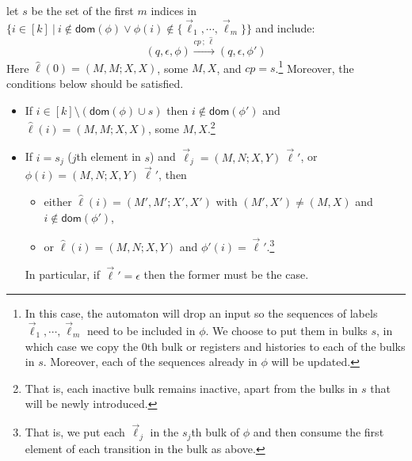\documentclass{article}
\theoremstyle{definition}
\newcommand\dom{\mathsf{dom}}
\newcommand\ta{,}
\begin{document}
\begin{itemize}
let $s$ be the set of the first $m$ indices in $\{ i\in[k]\ |\ i\notin\dom(\phi)\lor\phi(i)\notin\{\vec\ell_1,\cdots,\vec\ell_m\}\}$ and include:
\[
(q,\epsilon,\phi)\xrightarrow{\mathit{cp}\,;\,\hat\ell}(q,\epsilon,\phi')
\]
Here $\hat\ell(0)=(M\ta M;X\ta X)$, some $M,X$, and $\mathit{cp}=s$.\footnote{In this case, the automaton will drop an input so the sequences of labels $\vec\ell_1,\cdots,\vec\ell_m$ need to be included in $\phi$. We choose to put them in bulks $s$, in which case we copy the 0th bulk or registers and histories to each of the bulks in $s$. Moreover, each of the sequences already in $\phi$ will be updated.}
Moreover, the conditions below should be satisfied.
\begin{itemize}
\item If $i\in[k]\setminus(\dom(\phi)\cup s)$ then $i\notin\dom(\phi')$ and $\hat\ell(i)=(M\ta M;X\ta X)$, some $M,X$.\footnote{That is, each inactive bulk remains inactive, apart from the bulks in $s$ that will be newly introduced.}
\item If $i=s_j$ ($j$th element in $s$) and $\vec\ell_j=(M\ta N;X\ta Y)\,\vec\ell'$, or $\phi(i)=(M\ta N;X\ta Y)\,\vec\ell'$, then
\begin{itemize}
\item either $\hat\ell(i)=(M'\ta M';X'\ta X')$ with $(M',X')\not=(M,X)$ and $i\notin\dom(\phi')$,
\item or $\hat\ell(i)=(M\ta N;X\ta Y)$ and $\phi'(i)=\vec\ell'$.\footnote{That is, we put each $\vec\ell_j$ in the $s_j$th bulk of $\phi$ and then consume the first element of each transition in the bulk as above.}
\end{itemize}
In particular, if $\vec\ell'=\epsilon$ then the former must be the case.
\end{itemize}
\end{itemize}
\end{document}
